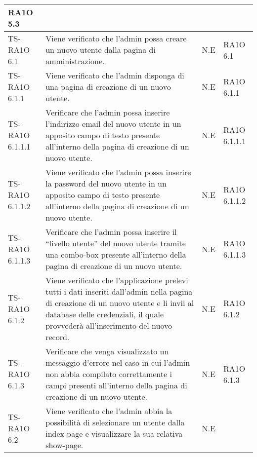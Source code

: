 \begin{center}
\begin{longtable}{| p{3cm} | p{6cm} | p{1.5cm} | p{2cm} | }
            RA1O 5.3 \newline  \\ \hline 
        TS-RA1O 6.1 & 
        Viene verificato che l'admin possa creare un nuovo utente dalla pagina di amministrazione. & N.E &       
            RA1O 6.1 \newline  \\ \hline 
        TS-RA1O 6.1.1 & 
        Viene verificato che l'admin disponga di una pagina di creazione di un nuovo utente. & N.E &       
            RA1O 6.1.1 \newline  \\ \hline 
        TS-RA1O 6.1.1.1 & 
        Verificare che l'admin possa inserire l'indirizzo email del nuovo utente in un apposito campo di testo presente all'interno della pagina di creazione di un nuovo utente. & N.E &       
            RA1O 6.1.1.1 \newline  \\ \hline 
        TS-RA1O 6.1.1.2 & 
        Viene verificato che l'admin possa inserire la password del nuovo utente in un apposito campo di testo presente all'interno della pagina di creazione di un nuovo utente. & N.E &       
            RA1O 6.1.1.2 \newline  \\ \hline 
        TS-RA1O 6.1.1.3 & 
        Verificare che l'admin possa inserire il ``livello utente'' del nuovo utente tramite una combo-box presente all'interno della pagina di creazione di un nuovo utente. & N.E &       
            RA1O 6.1.1.3 \newline  \\ \hline 
        TS-RA1O 6.1.2 & 
        Viene verificato che l'applicazione prelevi tutti i dati inseriti dall'admin nella pagina di creazione di un nuovo utente e li invii al database delle credenziali, il quale provvederà all'inserimento del nuovo record. & N.E &       
            RA1O 6.1.2 \newline  \\ \hline 
        TS-RA1O 6.1.3 & 
        Verificare che venga visualizzato un messaggio d'errore nel caso in cui l'admin non abbia compilato correttamente i campi presenti all'interno della pagina di creazione di un nuovo utente. & N.E &       
            RA1O 6.1.3 \newline  \\ \hline 
        TS-RA1O 6.2 & 
        Viene verificato che l'admin abbia la possibilità di selezionare un utente dalla index-page e visualizzare la sua relativa show-page. & N.E &       

\end{longtable}
\end{center}
